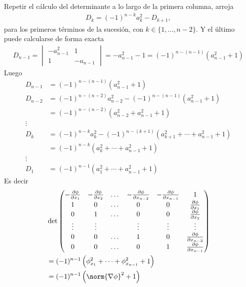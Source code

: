 \documentclass{report}
\theoremstyle{remark}
\begin{document}
  Repetir el cálculo del determinante a lo largo de la primera columna, arroja
  \begin{align}
    D_k = (- 1)^{n - k} a_k^2 - D_{k + 1},
  \end{align}
  para los primeros términos de la sucesión, con \(k \in \{1, \dots, n - 2\}\).
  Y el último puede calcularse de forma exacta
  \begin{align}
    D_{n - 1} 
    =
    \begin{vmatrix}
      - a_{n - 1}^2 &1 \\
      1 &- a_{n - 1}
    \end{vmatrix}
    =
    - a_{n - 1}^2 - 1
    =
    (- 1)^{n - (n - 1)} (a_{n - 1}^2 + 1)
  \end{align}
  Luego
  \begin{align}
    D_{n - 1}
    &=
    (- 1)^{n - (n - 1)} (a_{n - 1}^2 + 1)
    \\
    D_{n - 2}
    &=
    (- 1)^{n - (n - 2)} a_{n - 2}^2 - (- 1)^{n - (n - 1)} (a_{n - 1}^2 + 1)
    \\
    &=
    (- 1)^{n - (n - 2)} (a_{n - 2}^2 + a_{n - 1}^2 + 1)
    \\
    \vdots\nonumber
    \\
    D_k
    &=
    (- 1)^{n - k} a_k^2 - (- 1)^{n - (k + 1)} (a_{k + 1}^2 + \cdots + a_{n - 1}^2 + 1)
    \\
    &=
    (- 1)^{n - k} (a_{k}^2 + \cdots + a_{n - 1}^2 + 1)
    \\
    \vdots\nonumber
    \\
    D_1
    &=
    (-1)^{n - 1} (a_1^2 + \cdots + a_{n - 1}^2 + 1)
  \end{align}
  Es decir
  \begin{align}
    &\det
    \begin{pmatrix}
      - \frac{\partial \phi}{\partial x_1}
      &- \frac{\partial \phi}{\partial x_2}
      &\dots
      &- \frac{\partial \phi}{\partial x_{n - 2}}
      &- \frac{\partial \phi}{\partial x_{n - 1}}
      &1
      \\
      1
      &0
      &\dots
      &0
      &0
      &\frac{\partial \phi}{\partial x_1}
      \\
      0
      &1
      &\dots
      &0
      &0
      &\frac{\partial \phi}{\partial x_2}
      \\
      \vdots
      &\vdots
      &
      &\vdots
      &\vdots
      &\vdots
      \\
      0
      &0
      &\dots
      &1
      &0
      &\frac{\partial \phi}{\partial x_{n - 2}}
      \\
      0
      &0
      &\dots
      &0
      &1
      &\frac{\partial \phi}{\partial x_{n - 1}}
    \end{pmatrix}
    \\
    &=
    (-1)^{n - 1} \left( \phi_{x_1}^2 + \cdots + \phi_{x_{n -1}}^2 + 1 \right)
    \\
    &=
    (-1)^{n - 1} \left( \norm{\nabla \phi}^2 + 1 \right)
  \end{align}
\end{document}
